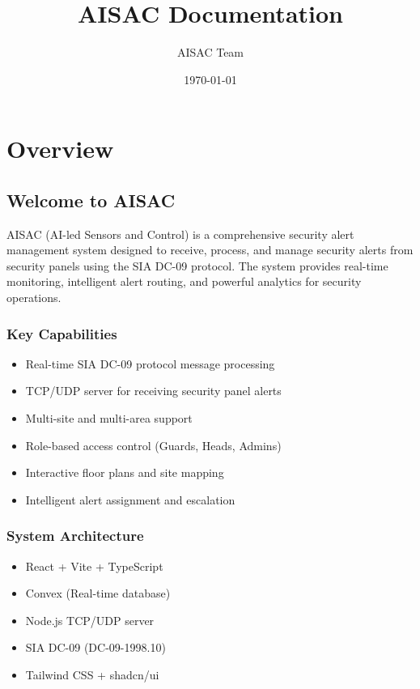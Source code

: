 \documentclass[12pt,a4paper]{article}
\title{AISAC Documentation}
\author{AISAC Team}
\date{\today}
\begin{document}
\maketitle
\tableofcontents
\newpage

\section{Overview}

\subsection{Welcome to AISAC}

AISAC (AI-led Sensors and Control) is a comprehensive security alert management system designed to receive, process, and manage security alerts from security panels using the SIA DC-09 protocol. The system provides real-time monitoring, intelligent alert routing, and powerful analytics for security operations.

\subsubsection{Key Capabilities}
\begin{itemize}
\item Real-time SIA DC-09 protocol message processing
\item TCP/UDP server for receiving security panel alerts
\item Multi-site and multi-area support
\item Role-based access control (Guards, Heads, Admins)
\item Interactive floor plans and site mapping
\item Intelligent alert assignment and escalation
\end{itemize}

\subsubsection{System Architecture}
\begin{itemize}
\item React + Vite + TypeScript
\item Convex (Real-time database)
\item Node.js TCP/UDP server
\item SIA DC-09 (DC-09-1998.10)
\item Tailwind CSS + shadcn/ui
\end{itemize}
\end{document}
